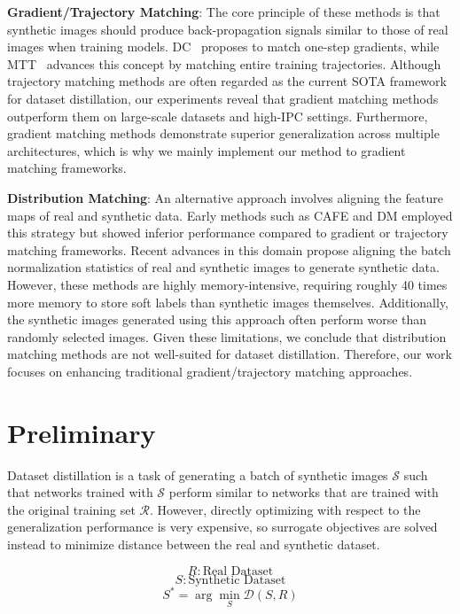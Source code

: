 \documentclass{article}
\theoremstyle{plain}
\theoremstyle{definition}
\theoremstyle{remark}
\begin{document}
\textbf{Gradient/Trajectory Matching}: The core principle of these methods is that synthetic images should produce back-propagation signals similar to those of real images when training models.
DC~\cite{} proposes to match one-step gradients, while MTT~\cite{} advances this concept by matching entire training trajectories.
Although trajectory matching methods are often regarded as the current SOTA framework for dataset distillation, our experiments reveal that gradient matching methods outperform them on large-scale datasets and high-IPC settings.
Furthermore, gradient matching methods demonstrate superior generalization across multiple architectures, which is why we mainly implement our method to gradient matching frameworks.

\textbf{Distribution Matching}: An alternative approach involves aligning the feature maps of real and synthetic data.
Early methods such as CAFE and DM employed this strategy but showed inferior performance compared to gradient or trajectory matching frameworks.
Recent advances in this domain propose aligning the batch normalization statistics of real and synthetic images to generate synthetic data.
However, these methods are highly memory-intensive, requiring roughly 40 times more memory to store soft labels than synthetic images themselves.
Additionally, the synthetic images generated using this approach often perform worse than randomly selected images.
Given these limitations, we conclude that distribution matching methods are not well-suited for dataset distillation. Therefore, our work focuses on enhancing traditional gradient/trajectory matching approaches.

\section{Preliminary}

Dataset distillation is a task of generating a batch of synthetic images $\mathcal{S}$ such that networks trained with $\mathcal{S}$ perform similar to networks that are trained with the original training set $\mathcal{R}$. However, directly optimizing with respect to the generalization performance is very expensive, so surrogate objectives are solved instead to minimize distance between the real and synthetic dataset.

\begin{equation}
R: \text{Real Dataset}
\end{equation}
\begin{equation}
S: \text{Synthetic Dataset}
\end{equation}
\begin{equation}
S^* = \arg \min_{S} \mathcal{D}(S,R)
\end{equation}
\end{document}
